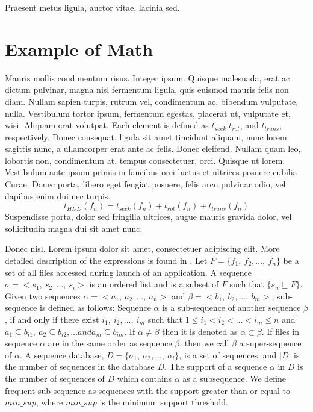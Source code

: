 \begin{savequote}[90mm]
  {\QuoteFont Praesent metus ligula, auctor vitae, lacinia sed.}
\end{savequote}

\chapter{Example of Math}
\label{chap:chapter_04}

Mauris mollis condimentum risus. Integer ipsum. Quisque
malesuada, erat ac dictum pulvinar, magna nisl fermentum ligula,
quis euismod mauris felis non diam. Nullam sapien turpis, rutrum
vel, condimentum ac, bibendum vulputate, nulla. Vestibulum tortor
ipsum, fermentum egestas, placerat ut, vulputate et, wisi. Aliquam
erat volutpat. Each element is defined as $t_{seek}$,$t_{rot}$, and
$t_{trans}$, respectively. Donec consequat, ligula sit amet tincidunt aliquam,
nunc lorem sagittis nunc, a ullamcorper erat ante ac felis. Donec
eleifend. Nullam quam leo, lobortis non, condimentum at, tempus
consectetuer, orci. Quisque ut lorem.  Vestibulum ante ipsum primis
in faucibus orci luctus et ultrices posuere cubilia Curae; Donec
porta, libero eget feugiat posuere, felis arcu pulvinar odio, vel
dapibus enim dui nec turpis. \begin{equation}
\label{eq:attf}
t_{HDD}(f_{n}) = t_{seek}(f_{n}) +t_{rot}(f_{n}) + t_{trans}(f_{n})
\end{equation}
Suspendisse porta, dolor sed fringilla
ultrices, augue mauris gravida dolor, vel sollicitudin magna dui sit
amet nunc. 

 
Donec nisl. Lorem ipsum dolor sit amet, consectetuer adipiscing elit. More
detailed description of the expressions is found in \cite{miner,CloSpan}. Let
$F=\{ f_{1}, ~ f_{2}, ..., ~ f_{n} \}$ be a set of all files accessed during
launch of an application.  A sequence 
$\sigma = < s_{1}, ~ s_{2}, ..., ~ s_{i} >$ 
is an ordered list and is a subset of $F$ such that 
$\{ s_{n} \sqsubseteq F \}$. 
Given two sequences 
$\alpha = < a_{1}, ~ a_{2}, ..., ~ a_{n} >$ and 
$\beta = < b_{1}, ~ b_{2}, ..., ~ b_{m} >$, sub-sequence is defined as follows:
Sequence  $\alpha$ is a sub-sequence of another sequence $\beta$, if and only
if there exist $i_{1}, ~ i_{2}, \ldots, ~ i_{m}$ such that 
$1 \le i_{1} < i_{2} < \ldots < i_{m} \le n$  and 
$a_{1} \subseteq b_{i1},  ~ a_{2} \subseteq b_{i2} , \ldots and  a_{m} \subseteq b_{im}$. 
If $\alpha \neq \beta$ then it is denoted as $ \alpha \subset \beta $. 
If files in sequence $\alpha$ are in the
same order as sequence $\beta$, then we call $\beta$ a super-sequence of
$\alpha$.  A sequence database, 
$D = \{ \sigma_{1}, ~ \sigma_{2}, ..., ~ \sigma_{i} \}$, 
is a set of sequences, and $|D|$ is the number of sequences in
the database $D$. The support of a sequence $\alpha$ in $D$ is the number of
sequences of $D$ which contains $\alpha$ as a subsequence. We define frequent
sub-sequence as sequences with the support greater than or equal to $min\_sup$,
where $min\_sup$ is the minimum support threshold.


